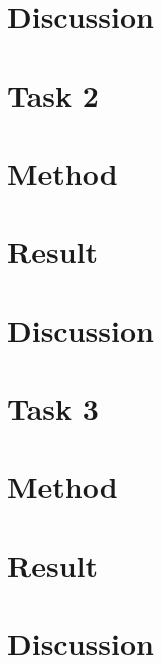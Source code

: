 \documentclass[a4paper,11pt]{article}
\begin{document}
\section*{Discussion}


\section*{Task 2}



\section*{Method}



\section*{Result}



\section*{Discussion}



\section*{Task 3}



\section*{Method}


\section*{Result}



\section*{Discussion}
\end{document}
